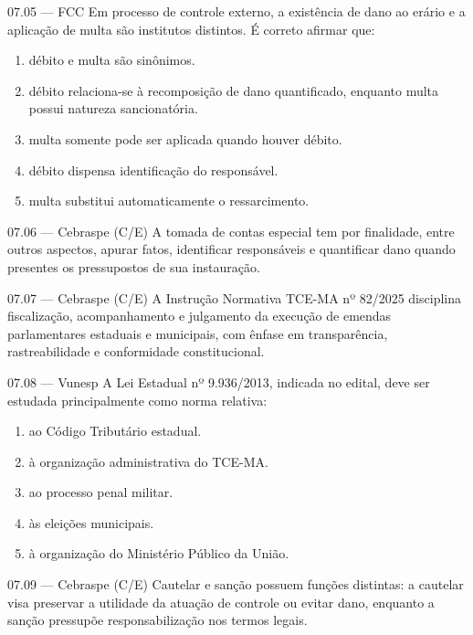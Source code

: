 \begin{questao}{ 07.05 — FCC}
Em processo de controle externo, a existência de dano ao erário e a aplicação de multa são institutos distintos. É correto afirmar que:
\begin{enumerate}[label=\Alph*)]
\item débito e multa são sinônimos.
\item débito relaciona-se à recomposição de dano quantificado, enquanto multa possui natureza sancionatória.
\item multa somente pode ser aplicada quando houver débito.
\item débito dispensa identificação do responsável.
\item multa substitui automaticamente o ressarcimento.
\end{enumerate}
\end{questao}

\begin{questao}{ 07.06 — Cebraspe (C/E)}
A tomada de contas especial tem por finalidade, entre outros aspectos, apurar fatos, identificar responsáveis e quantificar dano quando presentes os pressupostos de sua instauração.
\end{questao}

\begin{questao}{ 07.07 — Cebraspe (C/E)}
A Instrução Normativa TCE-MA nº 82/2025 disciplina fiscalização, acompanhamento e julgamento da execução de emendas parlamentares estaduais e municipais, com ênfase em transparência, rastreabilidade e conformidade constitucional.
\end{questao}

\begin{questao}{ 07.08 — Vunesp}
A Lei Estadual nº 9.936/2013, indicada no edital, deve ser estudada principalmente como norma relativa:
\begin{enumerate}[label=\Alph*)]
\item ao Código Tributário estadual.
\item à organização administrativa do TCE-MA.
\item ao processo penal militar.
\item às eleições municipais.
\item à organização do Ministério Público da União.
\end{enumerate}
\end{questao}

\begin{questao}{ 07.09 — Cebraspe (C/E)}
Cautelar e sanção possuem funções distintas: a cautelar visa preservar a utilidade da atuação de controle ou evitar dano, enquanto a sanção pressupõe responsabilização nos termos legais.
\end{questao}

